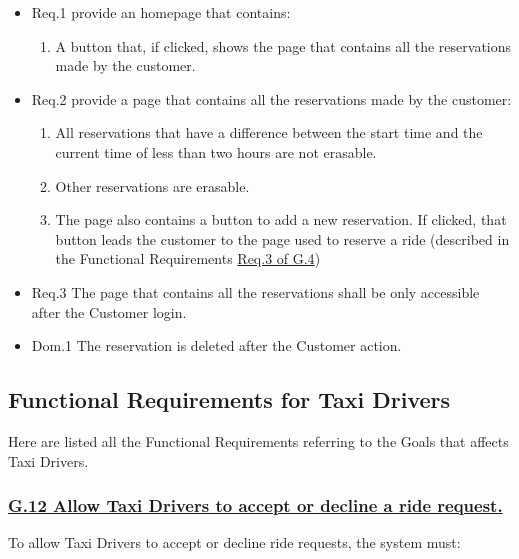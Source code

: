				\begin{itemize}
					\item \lbrack Req.1\rbrack \label{sec:fr1_g11} provide an homepage that contains:
						\begin{enumerate}
							\item A button that, if clicked, shows the page that contains all the reservations made by the customer.
						\end{enumerate}
					\item \lbrack Req.2\rbrack \label{sec:fr2_g11} provide a page that contains all the reservations made by the customer:
						\begin{enumerate}
							\item All reservations that have a difference between the start time and the current time of less than two hours are not erasable.
							\item Other reservations are erasable.
							\item The page also contains a button to add a new reservation. If clicked, that button leads the customer to the page used to reserve a ride (described in the Functional Requirements \hyperref[sec:fr3_g4]{Req.3 of G.4})
						\end{enumerate}
					\item \lbrack Req.3\rbrack \label{sec:fr3_g11} The page that contains all the reservations shall be only accessible after the Customer login.
					\item \lbrack Dom.1\rbrack \label{sec:da1_g11} The reservation is deleted after the Customer action.
				\end{itemize}

		\subsection{Functional Requirements for Taxi Drivers}
		Here are listed all the Functional Requirements referring to the Goals that affects Taxi Drivers.

			\subsubsection{\lbrack \hyperref[sec:g12]{G.12 Allow Taxi Drivers to accept or decline a ride request.}\rbrack}\label{sec:frs12}
			To allow Taxi Drivers to accept or decline ride requests, the system must:


